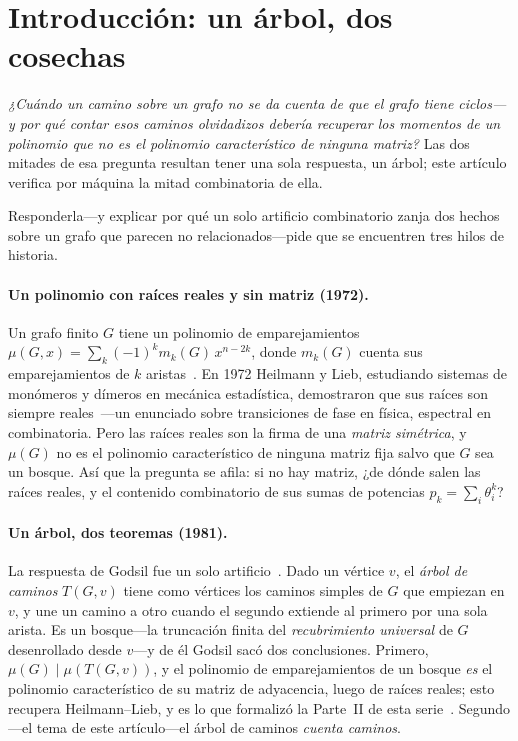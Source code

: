 \documentclass[11pt]{article}
\begin{document}
\section{Introducci\'on: un \'arbol, dos cosechas}
\label{sec:intro}

\emph{¿Cu\'ando un camino sobre un grafo no se da cuenta de que el grafo tiene ciclos---y por qu\'e
contar esos caminos olvidadizos deber\'ia recuperar los momentos de un polinomio que no es el polinomio
caracter\'istico de ninguna matriz?} Las dos mitades de esa pregunta resultan tener una sola respuesta,
un \'arbol; este art\'iculo verifica por m\'aquina la mitad combinatoria de ella.

Responderla---y explicar por qu\'e un solo artificio combinatorio zanja dos hechos sobre un grafo que
parecen no relacionados---pide que se encuentren tres hilos de historia.

\paragraph{Un polinomio con ra\'ices reales y sin matriz (1972).} Un grafo finito $G$ tiene un
polinomio de emparejamientos $\mu(G,x)=\sum_{k}(-1)^k m_k(G)\,x^{n-2k}$, donde $m_k(G)$ cuenta sus
emparejamientos de $k$ aristas~\cite{Farrell1979,LovaszPlummer}. En 1972 Heilmann y Lieb, estudiando
sistemas de mon\'omeros y d\'imeros en mec\'anica estad\'istica, demostraron que sus ra\'ices son
siempre reales~\cite{HeilmannLieb}---un enunciado sobre transiciones de fase en f\'isica, espectral en
combinatoria. Pero las ra\'ices reales son la firma de una \emph{matriz sim\'etrica}, y $\mu(G)$ no es
el polinomio caracter\'istico de ninguna matriz fija salvo que $G$ sea un bosque. As\'i que la pregunta
se afila: si no hay matriz, ¿de d\'onde salen las ra\'ices reales, y el contenido combinatorio de sus
sumas de potencias $p_k=\sum_i\theta_i^{k}$?

\paragraph{Un \'arbol, dos teoremas (1981).} La respuesta de Godsil fue un solo
artificio~\cite{Godsil1981a,Godsil1981b,GodsilBook}. Dado un v\'ertice $v$, el \emph{\'arbol de
caminos} $T(G,v)$ tiene como v\'ertices los caminos simples de $G$ que empiezan en $v$, y une un camino
a otro cuando el segundo extiende al primero por una sola arista. Es un bosque---la truncaci\'on finita
del \emph{recubrimiento universal} de $G$ desenrollado desde $v$---y de \'el Godsil sac\'o dos
conclusiones. Primero, $\mu(G)\mid\mu(T(G,v))$, y el polinomio de emparejamientos de un bosque \emph{es}
el polinomio caracter\'istico de su matriz de adyacencia, luego de ra\'ices reales; esto recupera
Heilmann--Lieb, y es lo que formaliz\'o la Parte~II de esta serie~\cite{PartII}. Segundo---el tema de
este art\'iculo---el \'arbol de caminos \emph{cuenta caminos}.
\end{document}
